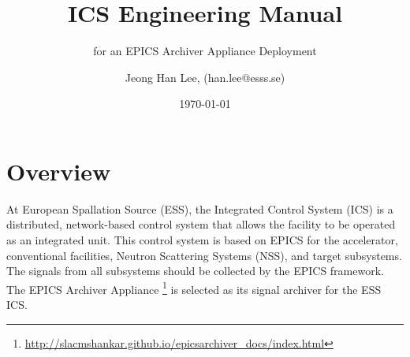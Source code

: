 \documentclass[11pt
  , a4paper
  , article
  , oneside
  , showtrims
]{memoir}
\begin{document}


\date{\today}




\title{ICS Engineering Manual}
\subtitle{for an EPICS Archiver Appliance Deployment}
\author{Jeong Han Lee, (han.lee@esss.se)}



\showtrimson

\esstitle
\newpage
\tableofcontents
\newpage



\chapter{Overview}
At European Spallation Source (ESS), the Integrated Control System (ICS) is a distributed, network-based control system that allows the facility to be operated as an integrated unit. This control system is based on EPICS for the accelerator, conventional facilities, Neutron Scattering Systems (NSS), and target subsystems. The signals from all subsystems should be collected by the EPICS framework. The EPICS Archiver Appliance {\footnote{\url{http://slacmshankar.github.io/epicsarchiver_docs/index.html}}} is selected as its signal archiver for the ESS ICS. 
\end{document}
